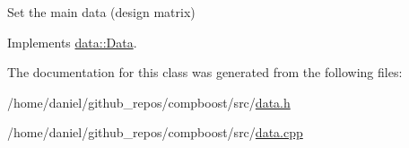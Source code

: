 Set the main data (design matrix) 



Implements \hyperlink{classdata_1_1_data_a0e928c49b31f803e7984cc24e2f73f70}{data\+::\+Data}.



The documentation for this class was generated from the following files\+:\begin{DoxyCompactItemize}
\item 
/home/daniel/github\+\_\+repos/compboost/src/\hyperlink{data_8h}{data.\+h}\item 
/home/daniel/github\+\_\+repos/compboost/src/\hyperlink{data_8cpp}{data.\+cpp}\end{DoxyCompactItemize}
